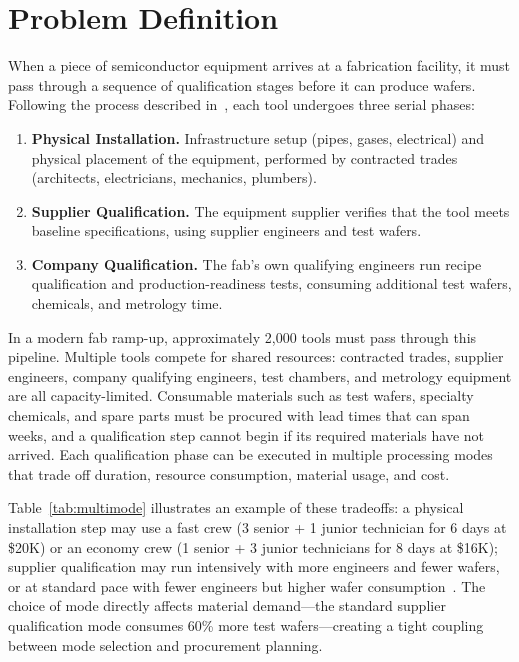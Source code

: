 \documentclass[11pt]{article}
\begin{document}
\section{Problem Definition}\label{sec:formulation}


When a piece of semiconductor equipment arrives at a fabrication facility, it must pass through a sequence of qualification stages before it can produce wafers.
Following the process described in~\citet{ieee2013semircpsp}, each tool undergoes three serial phases:

\begin{enumerate}
    \item \textbf{Physical Installation.} Infrastructure setup (pipes, gases, electrical) and physical placement of the equipment, performed by contracted trades (architects, electricians, mechanics, plumbers).
    \item \textbf{Supplier Qualification.} The equipment supplier verifies that the tool meets baseline specifications, using supplier engineers and test wafers.
    \item \textbf{Company Qualification.} The fab's own qualifying engineers run recipe qualification and production-readiness tests, consuming additional test wafers, chemicals, and metrology time.
\end{enumerate}

In a modern fab ramp-up, approximately 2{,}000 tools must pass through this pipeline.
Multiple tools compete for shared resources: contracted trades, supplier engineers, company qualifying engineers, test chambers, and metrology equipment are all capacity-limited.
Consumable materials such as test wafers, specialty chemicals, and spare parts must be procured with lead times that can span weeks, and a qualification step cannot begin if its required materials have not arrived. Each qualification phase can be executed in multiple processing modes that trade off duration, resource consumption, material usage, and cost.

Table~\ref{tab:multimode} illustrates an example of these tradeoffs: a physical installation step may use a fast crew (3 senior + 1 junior technician for 6 days at \$20K) or an economy crew (1 senior + 3 junior technicians for 8 days at \$16K); supplier qualification may run intensively with more engineers and fewer wafers, or at standard pace with fewer engineers but higher wafer consumption~\citep{ieee2013semircpsp}.
The choice of mode directly affects material demand---the standard supplier qualification mode consumes 60\% more test wafers---creating a tight coupling between mode selection and procurement planning.
\end{document}
